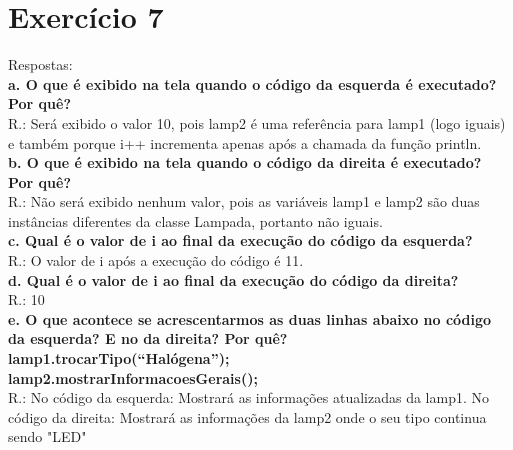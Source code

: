 \documentclass[12pt,a4paper,brazil]{article}
\begin{document}
\section*{Exercício 7}
Respostas: \\
\textbf{a. O que é exibido na tela quando o código da esquerda é executado? Por quê?} \\
R.: Será exibido o valor 10, pois lamp2 é uma referência para lamp1 (logo iguais) e também porque i++ incrementa apenas após a chamada da função println. \\
\textbf{b. O que é exibido na tela quando o código da direita é executado? Por quê?} \\
R.: Não será exibido nenhum valor, pois as variáveis lamp1 e lamp2 são duas instâncias diferentes da classe Lampada, portanto não iguais. \\
\textbf{c. Qual é o valor de i ao final da execução do código da esquerda?} \\
R.: O valor de i após a execução do código é 11. \\
\textbf{d. Qual é o valor de i ao final da execução do código da direita?} \\
R.: 10 \\
\textbf{e. O que acontece se acrescentarmos as duas linhas abaixo no código da esquerda? E no da direita? Por quê? \\
lamp1.trocarTipo(“Halógena”); \\
lamp2.mostrarInformacoesGerais();} \\
R.: No código da esquerda: Mostrará as informações atualizadas da lamp1. No código da direita: Mostrará as informações da lamp2 onde o seu tipo continua sendo "LED"
\end{document}
